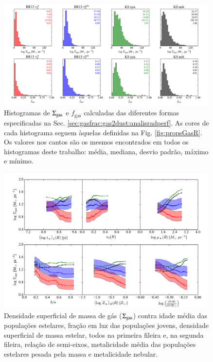 \begin{figure}
	\centering
	\includegraphics[width=0.99\textwidth]{figuras/histo_gas_R.pdf}
	\caption[Histogramas de $\SigmaGas$ e $f_{\mathrm{gas}}$.]
	{Histogramas de $\SigmaGas$ e $f_{\mathrm{gas}}$ calculadas das diferentes formas especificadas
na Sec. \ref{sec:gasfrac:gas2dust:analisradperf}. As cores de cada histograma seguem àquelas
definidas na Fig. \ref{fig:propsGasR}. Os valores nos cantos são os mesmos encontrados em todos os
histogramas deste trabalho: média, mediana, desvio padrão, máximo e mínimo.}
	\label{fig:histoGas}
\end{figure}

\begin{figure}
	\centering
 	\includegraphics[width=0.99\textwidth]{figuras/props_SigmaGas.pdf}
 	\caption[Propriedades físicas e $\SigmaGas$.]
 	{Densidade superficial de massa de gás ($\SigmaGas$) contra idade média das populações estelares,
fração em luz das populações jovens, densidade superficial de massa estelar, todos na primeira
fileira e, na segunda fileira, relação de semi-eixos, metalicidade média das populações estelares
pesada pela massa e metalicidade nebular.}
	\label{fig:propsSigmaGas}
\end{figure}

